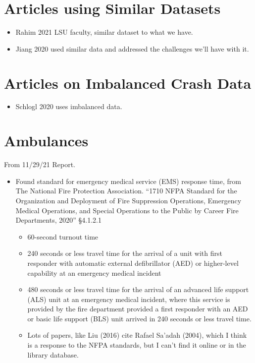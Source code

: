 \section{Articles using Similar Datasets}

\begin{itemize}
	\item Rahim 2021 \cite{RAHIM2021106090} LSU faculty, similar dataset to what we have.  
	\item Jiang 2020 \cite{JIANG2020105520} used similar data and addressed the challenges we'll have with it.  
	
\end{itemize}

\section{Articles on Imbalanced Crash Data}
\label{sec:Crash_Imbalanced_Papers}

\begin{itemize}
	\item  Schlogl 2020 \cite{SCHLOGL2020105398} uses imbalanced data.
\end{itemize}

\section{Ambulances}

From 11/29/21 Report.

\begin{itemize}
	\item Found standard for emergency medical service (EMS) response time, from The National Fire Protection Association.
	``1710 NFPA Standard for the Organization and Deployment of Fire Suppression Operations, Emergency Medical Operations,  and Special Operations to the Public by Career Fire Departments, 2020''
	  \S 4.1.2.1
	\begin{itemize}
		\item 60-second turnout time 
		\item 240  seconds  or  less  travel  time  for  the  arrival  of  a  unit with  first  responder  with  automatic  external  defibrillator (AED) or higher-level capability at an emergency medical incident
		\item 480 seconds or less travel time for the arrival of an advanced  life  support  (ALS)  unit  at  an  emergency  medical  incident,  where  this  service  is  provided  by  the  fire department  provided  a  first  responder  with  an  AED  or basic  life  support  (BLS)  unit  arrived  in  240  seconds  or less travel time.
		\item Lots of papers, like Liu (2016)\cite{Liu_2016} cite Rafael Sa'adah (2004), which I think is a response to the NFPA standards, but I can't find it online or in the library database.
	\end{itemize}	
\end{itemize}

